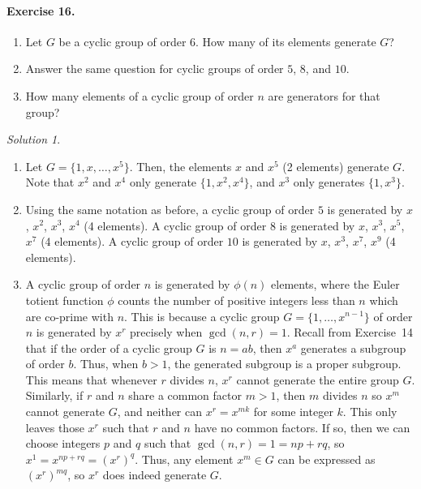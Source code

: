 \documentclass[11pt]{report}
\theoremstyle{remark}
\newtheorem*{solution}{Solution}
\begin{document}
    \paragraph{Exercise 16.} \mbox{}
    \begin{enumerate}
        \itemsep0em
        \item Let $G$ be a cyclic group of order $6$. How many of its elements
        generate $G$?
        \item Answer the same question for cyclic groups of order $5$, $8$, and
        $10$.
        \item How many elements of a cyclic group of order $n$ are generators for
        that group?
    \end{enumerate}
    \begin{solution} \mbox{}
    \begin{enumerate}
        \item Let $G = \{1, x, \dots, x^5\}$. Then, the elements $x$ and $x^5$ (2
        elements) generate $G$. Note that $x^2$ and $x^4$ only generate $\{1, x^2,
        x^4\}$, and $x^3$ only generates $\{1, x^3\}$.

        \item Using the same notation as before, a cyclic group of order $5$ is
        generated by $x$, $x^2$, $x^3$, $x^4$ (4 elements). A cyclic group of order
        $8$ is generated by $x$, $x^3$, $x^5$, $x^7$ (4 elements). A cyclic group of
        order $10$ is generated by $x$, $x^3$, $x^7$, $x^9$ (4 elements).

        \item A cyclic group of order $n$ is generated by $\phi(n)$ elements, where
        the Euler totient function $\phi$ counts the number of positive integers
        less than $n$ which are co-prime with $n$. This is because a cyclic group
        $G = \{1, \dots, x^{n - 1}\}$ of order $n$ is generated by $x^r$ precisely
        when $\gcd(n, r) = 1$. Recall from Exercise~14 that if the order of a cyclic
        group $G$ is $n = ab$, then $x^a$ generates a subgroup of order $b$. Thus,
        when $b > 1$, the generated subgroup is a proper subgroup. This means that
        whenever $r$ divides $n$, $x^r$ cannot generate the entire group $G$.
        Similarly, if $r$ and $n$ share a common factor $m > 1$, then $m$ divides
        $n$ so $x^m$ cannot generate $G$, and neither can $x^r = x^{mk}$ for some
        integer $k$. This only leaves those $x^r$ such that $r$ and $n$ have no
        common factors. If so, then we can choose integers $p$ and $q$ such that
        $\gcd(n, r) = 1 = np + rq$, so $x^1 = x^{np + rq} = (x^r)^q$. Thus, any
        element $x^m \in G$ can be expressed as $(x^r)^{mq}$, so $x^r$ does indeed
        generate $G$.
    \end{enumerate}
    \end{solution}
\end{document}
